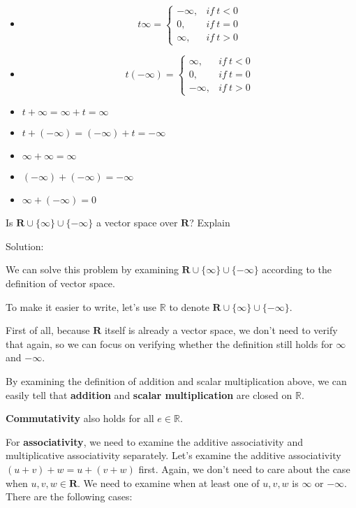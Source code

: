 \documentclass[12pt, letterpaper, oneside]{book}
\begin{document}
\begin{itemize}
  \item
    \[
      t \infty = \begin{cases}
        -\infty, & if \ t < 0 \\
        0,       & if \ t = 0 \\
        \infty,  & if \ t > 0
      \end{cases}
    \]
  \item
    \[
      t (-\infty) = \begin{cases}
        \infty,   & if \ t < 0 \\
        0,        & if \ t = 0 \\
        -\infty,  & if \ t > 0
      \end{cases}
    \]
  \item $t + \infty = \infty + t = \infty$
  \item $t + (-\infty) = (-\infty) + t = -\infty$
  \item $\infty + \infty = \infty$
  \item $(-\infty) + (-\infty) = -\infty$
  \item $\infty + (-\infty) = 0$
\end{itemize}

Is $\mathbf{R} \cup \{\infty\} \cup \{-\infty\}$ a vector space over
$\mathbf{R}$? Explain

Solution:

We can solve this problem by examining $\mathbf{R} \cup \{\infty\} \cup
\{-\infty\}$ according to the definition of vector space.

To make it easier to write, let's use $\mathbb{R}$ to denote $\mathbf{R} \cup
\{\infty\} \cup \{-\infty\}$.

First of all, because $\mathbf{R}$ itself is already a vector space, we don't
need to verify that again, so we can focus on verifying whether the definition
still holds for $\infty$ and $-\infty$.

By examining the definition of addition and scalar multiplication above, we can
easily tell that \textbf{addition} and \textbf{scalar multiplication} are
closed on $\mathbb{R}$.

\textbf{Commutativity} also holds for all $e \in \mathbb{R}$.

For \textbf{associativity}, we need to examine the additive associativity and
multiplicative associativity separately. Let's examine the additive
associativity $(u + v) + w = u + (v + w)$ first. Again, we don't need to care
about the case when $u, v, w \in \mathbf{R}$. We need to examine when at least
one of $u, v, w$ is $\infty$ or $-\infty$. There are the following cases:
\end{document}

